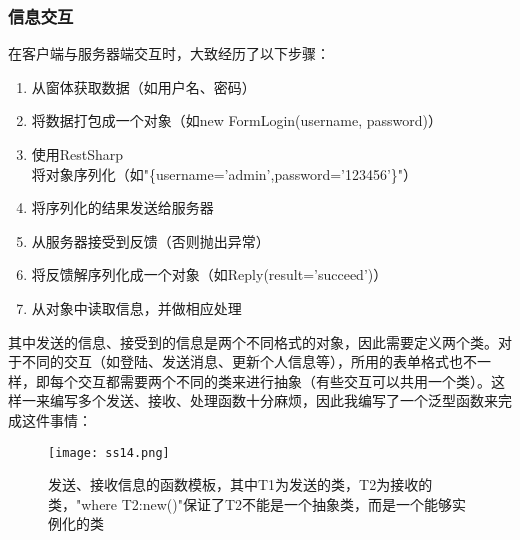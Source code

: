 \documentclass[a4paper,11pt]{article}
\begin{document}
        \subsubsection{信息交互}
            在客户端与服务器端交互时，大致经历了以下步骤：\par
            \begin{enumerate}
                \item 从窗体获取数据（如用户名、密码）
                \item 将数据打包成一个对象（如new FormLogin(username, password)）
                \item 使用RestSharp\textsuperscript{\cite{6}} 将对象序列化（如"\{username='admin',password='123456'\}"）
                \item 将序列化的结果发送给服务器
                \item 从服务器接受到反馈（否则抛出异常）
                \item 将反馈解序列化成一个对象（如Reply(result='succeed')）
                \item 从对象中读取信息，并做相应处理
            \end{enumerate}
            其中发送的信息、接受到的信息是两个不同格式的对象，因此需要定义两个类。对于不同的交互（如登陆、发送消息、更新个人信息等），所用的表单格式也不一样，即每个交互都需要两个不同的类来进行抽象（有些交互可以共用一个类）。这样一来编写多个发送、接收、处理函数十分麻烦，因此我编写了一个泛型函数来完成这件事情：
            \begin{figure}[H]
                \centering
                \texttt{[image: ss14.png]}
                \caption{发送、接收信息的函数模板，其中T1为发送的类，T2为接收的类，"where T2:new()"保证了T2不能是一个抽象类，而是一个能够实例化的类}
            \end{figure}
\end{document}

